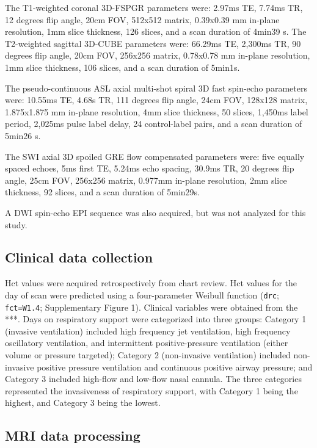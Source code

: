 \documentclass[
  letterpaper,
  DIV=11,
  numbers=noendperiod]{scrartcl}
\begin{document}
The T1-weighted coronal 3D-FSPGR parameters were: 2.97ms TE, 7.74ms TR,
12 degrees flip angle, 20cm FOV, 512x512 matrix, 0.39x0.39 mm in-plane
resolution, 1mm slice thickness, 126 slices, and a scan duration of
4min39 s. The T2-weighted sagittal 3D-CUBE parameters were: 66.29ms TE,
2,300ms TR, 90 degrees flip angle, 20cm FOV, 256x256 matrix, 0.78x0.78
mm in-plane resolution, 1mm slice thickness, 106 slices, and a scan
duration of 5min1s.

The pseudo-continuous ASL axial multi-shot spiral 3D fast spin-echo
parameters were: 10.55ms TE, 4.68s TR, 111 degrees flip angle, 24cm FOV,
128x128 matrix, 1.875x1.875 mm in-plane resolution, 4mm slice thickness,
50 slices, 1,450ms label period, 2,025ms pulse label delay, 24
control-label pairs, and a scan duration of 5min26 s.

The SWI axial 3D spoiled GRE flow compensated parameters were: five
equally spaced echoes, 5ms first TE, 5.24ms echo spacing, 30.9ms TR, 20
degrees flip angle, 25cm FOV, 256x256 matrix, 0.977mm in-plane
resolution, 2mm slice thickness, 92 slices, and a scan duration of
5min29s.

A DWI spin-echo EPI sequence was also acquired, but was not analyzed for
this study.

\subsection{Clinical data collection}\label{clinical-data-collection}

Hct values were acquired retrospectively from chart review. Hct values
for the day of scan were predicted using a four-parameter Weibull
function (\texttt{drc}; \texttt{fct=W1.4}; Supplementary Figure 1).
Clinical variables were obtained from the ***. Days on respiratory
support were categorized into three groups: Category 1 (invasive
ventilation) included high frequency jet ventilation, high frequency
oscillatory ventilation, and intermittent positive-pressure ventilation
(either volume or pressure targeted); Category 2 (non-invasive
ventilation) included non-invasive positive pressure ventilation and
continuous positive airway pressure; and Category 3 included high-flow
and low-flow nasal cannula. The three categories represented the
invasiveness of respiratory support, with Category 1 being the highest,
and Category 3 being the lowest.

\subsection{MRI data processing}\label{mri-data-processing}
\end{document}
